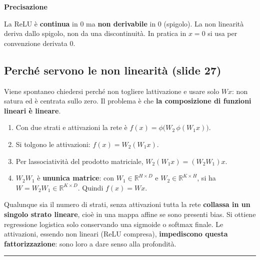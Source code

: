 \documentclass[11pt,a4paper,oneside,openany]{book}
\providecommand{\tightlist}{\setlength{\itemsep}{0pt}\setlength{\parskip}{0pt}}
\renewenvironment{quote}{\list{}{\leftmargin=1em\rightmargin=0pt}\item\relax}{\endlist}
\begin{document}
\begin{quote}
\textbf{Precisazione}
\end{quote}

\begin{quote}
La ReLU è \textbf{continua} in 0 ma \textbf{non derivabile} in 0 (spigolo). La non linearità deriva dallo spigolo, non da una discontinuità. In pratica in \(x = 0\) si usa per convenzione derivata 0.
\end{quote}

\subsection{Perché servono le non linearità (slide 27)}\label{f01-r406}

Viene spontaneo chiedersi perché non togliere l\textquotesingle attivazione e usare solo \(Wx\): non satura ed è centrata sullo zero. Il problema è che \textbf{la composizione di funzioni lineari è lineare}.

\begin{enumerate}
\def\labelenumi{\arabic{enumi}.}
\tightlist
\item
  Con due strati e attivazioni la rete è \(f(x) = \phi\big(W_2\,\phi(W_1 x)\big)\).
\item
  Si tolgono le attivazioni: \(f(x) = W_2 (W_1 x)\).
\item
  Per l\textquotesingle associatività del prodotto matriciale, \(W_2 (W_1 x) = (W_2 W_1)x\).
\item
  \(W_2 W_1\) è \textbf{un\textquotesingle unica matrice}: con \(W_1\in\mathbb{R}^{H\times D}\) e \(W_2\in\mathbb{R}^{K\times H}\), si ha \(W = W_2W_1 \in \mathbb{R}^{K\times D}\). Quindi \(f(x) = Wx\).
\end{enumerate}

Qualunque sia il numero di strati, senza attivazioni tutta la rete \textbf{collassa in un singolo strato lineare}, cioè in una mappa affine se sono presenti bias. Si ottiene regressione logistica solo conservando una sigmoide o softmax finale. Le attivazioni, essendo non lineari (ReLU compresa), \textbf{impediscono questa fattorizzazione}: sono loro a dare senso alla profondità.

\begin{center}\rule{0.5\linewidth}{0.5pt}\end{center}
\end{document}
